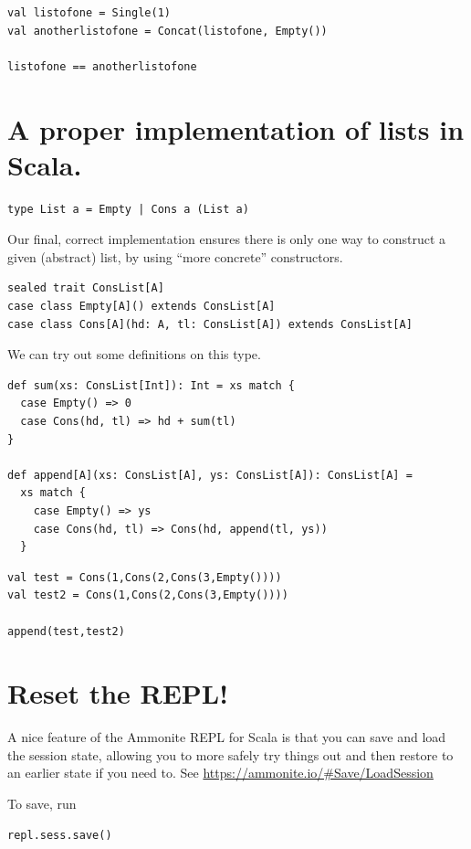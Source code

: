\documentclass[11pt]{article}
\begin{document}
\begin{verbatim}
val listofone = Single(1)
val anotherlistofone = Concat(listofone, Empty())

listofone == anotherlistofone
\end{verbatim}

\section{A proper implementation of lists in Scala.}
\label{sec:org63bc98f}
\begin{verbatim}
type List a = Empty | Cons a (List a)
\end{verbatim}

Our final, correct implementation
ensures there is only one way to construct a given (abstract) list,
by using “more concrete” constructors.
\begin{verbatim}
sealed trait ConsList[A]
case class Empty[A]() extends ConsList[A]
case class Cons[A](hd: A, tl: ConsList[A]) extends ConsList[A]
\end{verbatim}

We can try out some definitions on this type.
\begin{verbatim}
def sum(xs: ConsList[Int]): Int = xs match {
  case Empty() => 0
  case Cons(hd, tl) => hd + sum(tl)
}

def append[A](xs: ConsList[A], ys: ConsList[A]): ConsList[A] =
  xs match {
    case Empty() => ys
    case Cons(hd, tl) => Cons(hd, append(tl, ys))
  }
\end{verbatim}

\begin{verbatim}
val test = Cons(1,Cons(2,Cons(3,Empty())))
val test2 = Cons(1,Cons(2,Cons(3,Empty())))

append(test,test2)
\end{verbatim}

\section{Reset the REPL!}
\label{sec:orgd2b8184}
A nice feature of the Ammonite REPL for Scala
is that you can save and load the session state,
allowing you to more safely try things out
and then restore to an earlier state if you need to.
See \url{https://ammonite.io/\#Save/LoadSession}

To save, run
\begin{verbatim}
repl.sess.save()
\end{verbatim}
\end{document}
